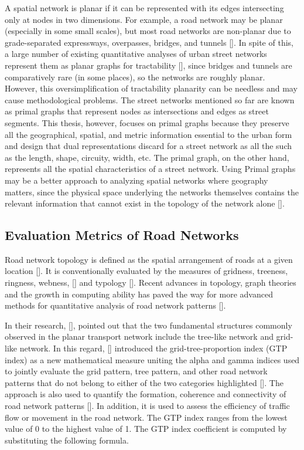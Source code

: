 A spatial network is planar if it can be represented with its edges intersecting only at nodes in two dimensions. For example, a road network may be planar (especially in some small scales), but most road networks are non-planar due to grade-separated expressways, overpasses, bridges, and tunnels [\cite{Boeing:2017}]. In spite of this, a large number of existing quantitative analyses of urban street networks represent them as planar graphs for tractability [\cite{Barthelemy:2008, Buhl:2006,Cardillo:2006, Masucci:2009, Strano:2013}], since bridges and tunnels are comparatively rare (in some places), so the networks are roughly planar. However, this oversimplification of tractability planarity can be needless and may cause methodological problems. The street networks mentioned so far are known as primal graphs that represent nodes as intersections and edges as street segments. This thesis, however, focuses on primal graphs because they preserve all the geographical, spatial, and metric information essential to the urban form and design that dual representations discard for a  street network as all the such as the length, shape, circuity, width, etc. The primal graph, on the other hand, represents all the spatial characteristics of a street network. Using Primal graphs may be a better approach to analyzing spatial networks where geography matters, since the physical space underlying the networks themselves contains the relevant information that cannot exist in the topology of the network alone [\cite{Ratti:2004}].

\subsection{Evaluation Metrics of Road Networks}
Road network topology is defined as the spatial arrangement of roads at a given location [\cite{Rodrigue:2016}]. It is conventionally evaluated by the measures of gridness, treeness, ringness, webness, [\cite{Barthelemy:2011, Buhl:2006, Gudmundsson:2013, Xie:2007}] and typology [\cite{Louf:2014}]. Recent advances in topology, graph theories and the growth in computing ability has paved the way for more advanced methods for quantitative analysis of road network patterns [\cite{Jiang:2004, Cardillo:2006, Bavelas:1948}].

In their research, [\cite{Xie:2007, Levinson:2012}], pointed out that the two fundamental structures commonly observed in the planar transport network include the tree-like network and grid-like network. In this regard, [\cite{Noda:1996, Tini:2018}] introduced the grid-tree-proportion index (GTP index) as a new mathematical measure uniting the alpha and gamma indices used to jointly evaluate the grid pattern, tree pattern, and other road network patterns that do not belong to either of the two categories highlighted [\cite{Usui:2011}]. The approach is also used to quantify the formation, coherence and connectivity of road network patterns [\cite{Gogoi:2013, Usui:2011, Wang:2017}]. In addition, it is used to assess the efficiency of traffic flow or movement in the road network. The GTP index ranges from the lowest value of 0 to the highest value of 1. The GTP index coefficient is computed by substituting the following formula.

